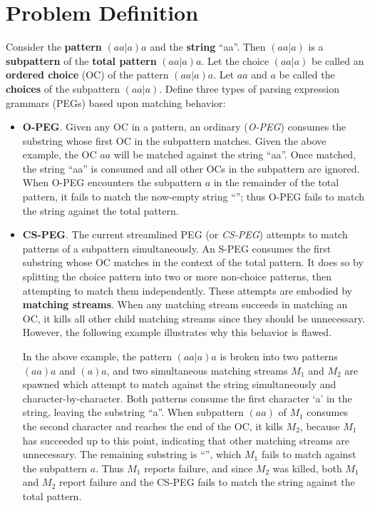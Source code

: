 \section{Problem Definition}

Consider the \textbf{pattern} $(aa|a)a$ and the \textbf{string} ``aa''.
Then $(aa|a)$ is a \textbf{subpattern} of the \textbf{total pattern}
$(aa|a)a$.  Let the choice $(aa|a)$ be called an \textbf{ordered choice}
(OC) of the pattern $(aa|a)a$. Let $aa$ and $a$ be called the
\textbf{choices} of the subpattern $(aa|a)$.  Define three
types of parsing expression grammars (PEGs) based upon matching behavior:

\begin{itemize}

  \item \textbf{O-PEG}. Given any OC in a pattern, an ordinary
    (\emph{O-PEG}) consumes the substring whose first OC in the
    subpattern matches.  Given the above example, the OC $aa$
    will be matched against the string ``aa''. Once matched, the string ``aa''
    is consumed and all other OCs in the subpattern are ignored. When
    O-PEG encounters the subpattern $a$ in the remainder of the total
    pattern, it fails to match the now-empty string ``''; thus O-PEG fails to
    match the string against the total pattern.

  \item \textbf{CS-PEG}. The current streamlined PEG (or \emph{CS-PEG}) attempts
    to match patterns of a subpattern simultaneously.  An S-PEG consumes the
    first substring whose OC matches in the context of the total pattern.
    It does so by splitting the choice pattern into two or more
    non-choice patterns, then attempting to match them independently.
    These attempts are embodied by \textbf{matching streams}. When any matching
    stream succeeds in matching an OC, it kills all other 
    child matching streams
    since they should be unnecessary. However, the following example
    illustrates why this behavior is flawed.
    
    In the above example, the pattern $(aa|a)a$ is broken into two
    patterns $(aa)a$ and $(a)a$, and two simultaneous matching
    streams $M_1$ and $M_2$ are spawned which attempt to match against the
    string simultaneously and character-by-character.  Both patterns consume
    the first character `a' in the string, leaving the substring ``a''.  When
    subpattern $(aa)$ of $M_1$ consumes the second character and reaches
    the end of the OC, it kills $M_2$, because $M_1$ has succeeded up to
    this point, indicating that other matching streams are unnecessary. The
    remaining substring is ``'', which $M_1$ fails to match against the
    subpattern $a$. Thus $M_1$ reports failure, and since $M_2$ was
    killed, both $M_1$ and $M_2$ report failure and the CS-PEG fails to match
    the string against the total pattern.


\end{itemize}
